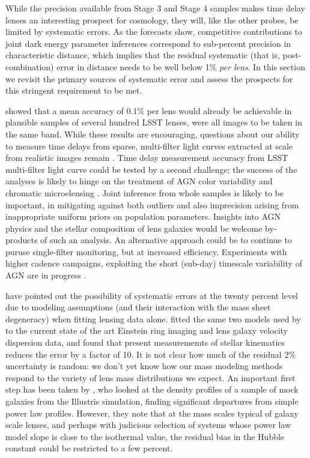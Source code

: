 While the precision available from Stage 3 and Stage 4 samples makes
time delay lenses an interesting prospect for cosmology, they will, like
the other probes, be limited by systematic errors. As the forecasts
show, competitive contributions to joint dark energy parameter
inferences correspond to sub-percent precision in characteristic
distance, which implies that the residual systematic (that is,
post-combination) error in  distance needs to be well below 1\% {\it per
lens}. In this section we revisit the primary sources of systematic
error and  assess the prospects for this stringent requirement to be
met.

\citet{TDC1} showed that a mean accuracy of 0.1\% per lens would already
be achievable in plausible samples of several hundred LSST lenses, were
all images to be taken in the same band.
While these results are encouraging, questions
about our ability to measure time delays from sparse, multi-filter light
curves extracted at scale from realistic images remain
\citep{TCM13}.
Time delay measurement accuracy from  LSST multi-filter
light curve could be tested by a second challenge; the success of the
analyses is likely to hinge on the treatment of AGN color variability
\citep[see e.g.\ ][and references therein]{SunEtal2014}
and chromatic  microelensing
\citep[see e.g.][and references therein]{HainlineEtal2013}.
Joint inference from whole samples is likely to
be important, in mitigating against both outliers and also imprecision
arising from inappropriate uniform priors on  population parameters.
Insights into AGN physics and the stellar composition  of lens galaxies
would be welcome by-products of such an analysis. An alternative approach
could be to continue to puruse single-filter monitoring, but at
increased efficiency. Experiments with higher cadence campaigns,
exploiting the short (sub-day) timescale variability of AGN are in
progress \citep[][F.~Courbin, priv.\ comm.]{BorosonEtal2016}.


\citet{S+S13} have pointed out the possibility of systematic errors at
the twenty percent level due to modeling assumptions (and their
interaction with the mass sheet degeneracy) when  fitting lensing data
alone.   \citet{Suy++14} fitted the same two models used by
\citet{S+S13}  to the current state of the art Einstein ring imaging and
lens galaxy velocity dispersion data,  and found that present
measurememts of stellar kinematics reduces the error by a factor of 10.
It is not clear  how much of the residual 2\% uncertainty is random: we
don't yet know  how our mass modeling methods respond to the variety of
lens mass  distributions we expect. An important first step has been
taken by  \citet{XuEtal2016}, who looked at the density profiles of a
sample of mock galaxies from the Illustris simulation, finding
significant departures from simple power law profiles. However, they
note that at the mass scales  typical of galaxy scale lenses, and
perhaps with judicious selection of systems whose power law model slope
is close to the isothermal value,  the residual bias in the Hubble
constant could be restricted to a few percent.

